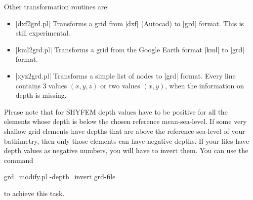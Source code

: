 Other transformation routines are:

\begin{itemize}

\item |dxf2grd.pl|  Transforms a grid from |dxf| (Autocad) to |grd|
format. This is still experimental.

\item |kml2grd.pl|  Transforms a grid from the Google Earth format |kml|
to |grd| format.

\item |xyz2grd.pl|  Transforms a simple list of nodes to |grd|
format. Every line contains 3 values $(x,y,z)$ or two values $(x,y)$,
when the information on depth is missing.

\end{itemize}

Please note that for SHYFEM depth values have to be positive 
for all the elements whose depth is below the chosen reference mean-sea-level.
If some very shallow grid elements have depths that are above the reference sea-level 
of your bathimetry, then only those elements can have negative depths.
If your files have depth values as negative numbers, you will have to invert
them. You can use the command

\begin{code}
    grd_modify.pl -depth_invert grd-file
\end{code}

to achieve this task.

